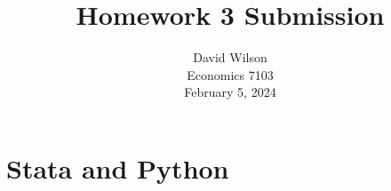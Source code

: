 \documentclass[letterpaper,10pt]{article}
\begin{document}
\title{Homework 3 Submission}



\author{David Wilson \\ Economics 7103 \\ February 5, 2024 }

  
  
\maketitle

\section*{Stata and Python}
\end{document}
